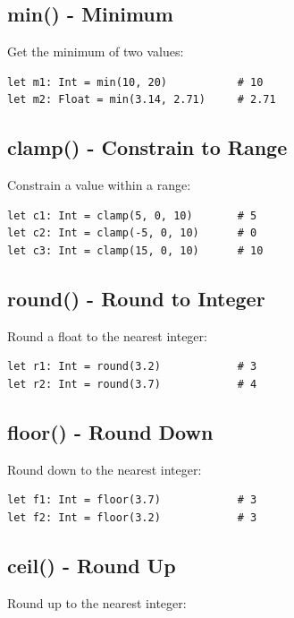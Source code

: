 \documentclass[11pt,twoside,openright]{book}
\begin{document}
\subsection{min() - Minimum}

Get the minimum of two values:

\begin{lstlisting}[language=ConstructLang]
let m1: Int = min(10, 20)           # 10
let m2: Float = min(3.14, 2.71)     # 2.71
\end{lstlisting}

\subsection{clamp() - Constrain to Range}

Constrain a value within a range:

\begin{lstlisting}[language=ConstructLang]
let c1: Int = clamp(5, 0, 10)       # 5
let c2: Int = clamp(-5, 0, 10)      # 0
let c3: Int = clamp(15, 0, 10)      # 10
\end{lstlisting}

\subsection{round() - Round to Integer}

Round a float to the nearest integer:

\begin{lstlisting}[language=ConstructLang]
let r1: Int = round(3.2)            # 3
let r2: Int = round(3.7)            # 4
\end{lstlisting}

\subsection{floor() - Round Down}

Round down to the nearest integer:

\begin{lstlisting}[language=ConstructLang]
let f1: Int = floor(3.7)            # 3
let f2: Int = floor(3.2)            # 3
\end{lstlisting}

\subsection{ceil() - Round Up}

Round up to the nearest integer:
\end{document}
